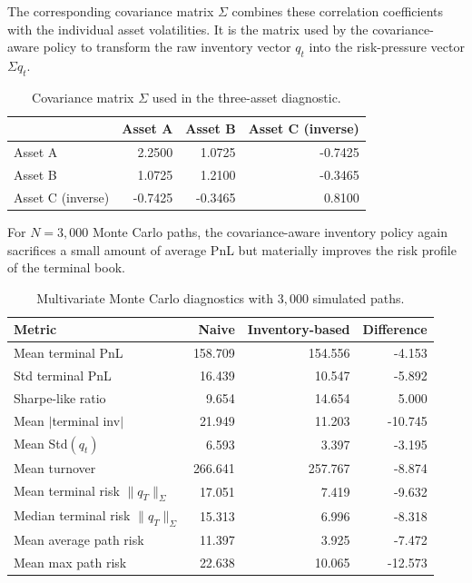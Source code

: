 The corresponding covariance matrix $\Sigma$ combines these correlation coefficients with the individual asset volatilities. It is the matrix used by the covariance-aware policy to transform the raw inventory vector $q_t$ into the risk-pressure vector $\Sigma q_t$.

\begin{table}[H]
\centering
\small
\caption{Covariance matrix $\Sigma$ used in the three-asset diagnostic.}
\begin{tabular}{@{}lrrr@{}}
\toprule
 & Asset A & Asset B & Asset C (inverse) \\
\midrule
Asset A           &  2.2500 &  1.0725 & -0.7425 \\
Asset B           &  1.0725 &  1.2100 & -0.3465 \\
Asset C (inverse) & -0.7425 & -0.3465 &  0.8100 \\
\bottomrule
\end{tabular}
\end{table}

For $N=3{,}000$ Monte Carlo paths, the covariance-aware inventory policy again sacrifices a small amount of average PnL but materially improves the risk profile of the terminal book.

\begin{table}[H]
\centering
\small
\caption{Multivariate Monte Carlo diagnostics with $3{,}000$ simulated paths.}
\begin{tabularx}{\textwidth}{@{}Xrrr@{}}
\toprule
Metric & Naive & Inventory-based & Difference \\
\midrule
Mean terminal PnL                         & 158.709 & 154.556 & -4.153 \\
Std terminal PnL                          &  16.439 &  10.547 & -5.892 \\
Sharpe-like ratio                         &   9.654 &  14.654 &  5.000 \\
Mean $|$terminal inv$|$                   &  21.949 &  11.203 & -10.745 \\
Mean Std$(q_t)$                           &   6.593 &   3.397 & -3.195 \\
Mean turnover                             & 266.641 & 257.767 & -8.874 \\
Mean terminal risk $\|q_T\|_\Sigma$       &  17.051 &   7.419 & -9.632 \\
Median terminal risk $\|q_T\|_\Sigma$     &  15.313 &   6.996 & -8.318 \\
Mean average path risk                    &  11.397 &   3.925 & -7.472 \\
Mean max path risk                        &  22.638 &  10.065 & -12.573 \\
\bottomrule
\end{tabularx}
\end{table}

